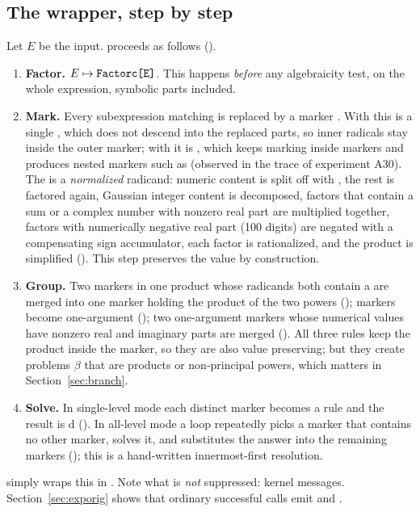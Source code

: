 \subsection{The wrapper, step by step}
\label{sec:wrapper}
Let $E$ be the input.  proceeds as follows
().
\begin{enumerate}
\item \textbf{Factor.} $E\mapsto\code{Factorc[E]}$. This happens \emph{before}
      any algebraicity test, on the whole expression, symbolic parts included.
\item \textbf{Mark.} Every subexpression matching
       is replaced by a marker
      . With  this is a single
      , which does not descend into the replaced parts, so
      inner radicals stay inside the outer marker; with 
      it is , which keeps marking inside markers and
      produces nested markers such as 
      (observed in the trace of experiment A30).
      The  is a \emph{normalized} radicand: numeric content is split
      off with , the rest is factored again, Gaussian
      integer content is decomposed, factors that contain a sum or a complex
      number with nonzero real part are multiplied together, factors with
      numerically negative real part (100 digits) are negated with a
      compensating sign accumulator, each factor is rationalized, and the
      product is simplified (). This step preserves the value by
      construction.
\item \textbf{Group.} Two markers in one product whose radicands both contain
      a  are merged into one marker holding the product of the two
      powers (); markers become one-argument
       (); two one-argument markers whose numerical
      values have nonzero real and imaginary parts are merged ().
      All three rules keep the product inside the marker, so they are also
      value preserving; but they create problems $\beta$ that are products or
      non-principal powers, which matters in Section~\ref{sec:branch}.
\item \textbf{Solve.} In single-level mode each distinct marker 
      becomes a rule  and the result is
      d (). In all-level mode a loop repeatedly picks
      a marker that contains no other marker, solves it, and substitutes the
      answer into the remaining markers (); this is a hand-written
      innermost-first resolution.
\end{enumerate}
 simply wraps this in .
Note what is \emph{not} suppressed: kernel messages. Section~\ref{sec:exporig}
shows that ordinary successful calls emit  and
.

